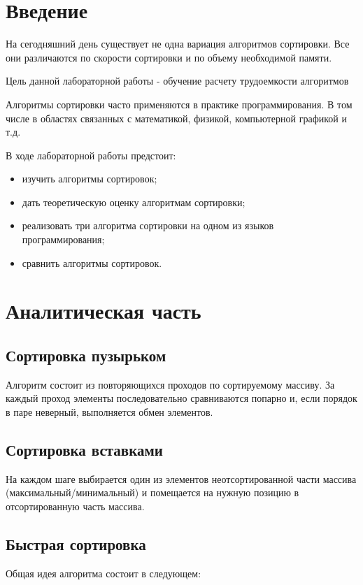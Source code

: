 \documentclass[12pt]{report}
\begin{document}



\tableofcontents

\newpage
\chapter*{Введение}

На сегодняшний день существует не одна вариация алгоритмов сортировки. Все они различаются по скорости сортировки и по объему необходимой памяти. 

Цель данной лабораторной работы - обучение расчету трудоемкости алгоритмов

Алгоритмы сортировки часто применяются в практике программирования. В том числе в областях связанных с математикой, физикой, компьютерной графикой и т.д.

В ходе лабораторной работы предстоит:
\begin{itemize}
	\item изучить алгоритмы сортировок;
	\item дать теоретическую оценку алгоритмам сортировки;
	\item реализовать три алгоритма сортировки на одном из языков программирования;  
	\item сравнить алгоритмы сортировок.
\end{itemize}

\chapter{Аналитическая часть}
\section{Сортировка пузырьком}
Алгоритм состоит из повторяющихся проходов по сортируемому массиву. За каждый проход элементы последовательно сравниваются попарно и, если порядок в паре неверный, выполняется обмен элементов.

\section{Сортировка вставками}
На каждом шаге выбирается один из элементов неотсортированной части массива (максимальный/минимальный) 
и помещается на нужную позицию в отсортированную часть массива. 

\section{Быстрая сортировка}
Общая идея алгоритма состоит в следующем:
\end{document}
